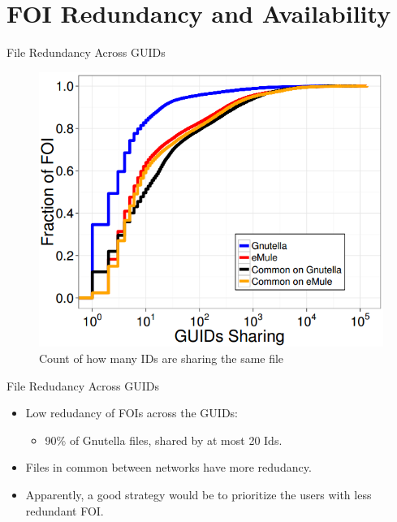 \documentclass[notes]{beamer}
\begin{document}
\section{FOI Redundancy and Availability}
\begin{frame}

\begin{block}{File Redundancy Across GUIDs}

\begin{figure}[!htb]
\centering
\includegraphics[scale=0.5]{FOI_redundancy}
\caption{Count of how many IDs are sharing the same file}
\label{fig:FOI_redundancy}
\end{figure}

\end{block}

\end{frame}

\begin{frame}

\begin{block}{File Redudancy Across GUIDs}

\begin{itemize}

\item[\checkmark]Low redudancy of FOIs across the GUIDs:
	\begin{itemize}
	
	\item 90\% of Gnutella files, shared by at most 20 Ids.
	
	\end{itemize}


\item[\checkmark]Files in common between networks have more redudancy.

\item[\checkmark]Apparently, a good strategy would be to prioritize the users with less redundant FOI.

\end{itemize}

\end{block}

\end{frame}
\end{document}
